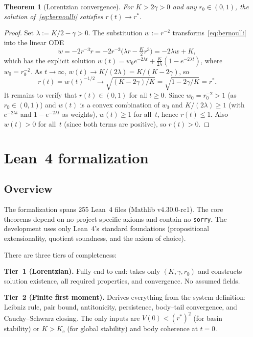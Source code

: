 \documentclass[11pt,a4paper]{article}
\newtheorem{theorem}{Theorem}[section]
\theoremstyle{definition}
\begin{document}
\begin{theorem}[Lorentzian convergence]\label{thm:lorentzian}
For $K>2\gamma>0$ and any $r_0\in(0,1)$, the solution of~\eqref{eq:bernoulli} satisfies $r(t)\to r^*$.
\end{theorem}

\begin{proof}
Set $\lambda:=K/2-\gamma>0$. The substitution $w:=r^{-2}$ transforms~\eqref{eq:bernoulli} into the linear ODE
\[
\dot w = -2r^{-3}\dot r = -2r^{-3}\bigl(\lambda r-\tfrac{K}{2}r^3\bigr) = -2\lambda w + K,
\]
which has the explicit solution $w(t) = w_0 e^{-2\lambda t} + \frac{K}{2\lambda}(1-e^{-2\lambda t})$, where $w_0=r_0^{-2}$. As $t\to\infty$, $w(t)\to K/(2\lambda)=K/(K-2\gamma)$, so
\[
r(t)=w(t)^{-1/2}\to\sqrt{(K-2\gamma)/K}=\sqrt{1-2\gamma/K}=r^*.
\]
It remains to verify that $r(t)\in(0,1)$ for all $t\geq 0$. Since $w_0=r_0^{-2}>1$ (as $r_0\in(0,1)$) and $w(t)$ is a convex combination of $w_0$ and $K/(2\lambda)\geq 1$ (with $e^{-2\lambda t}$ and $1-e^{-2\lambda t}$ as weights), $w(t)\geq 1$ for all~$t$, hence $r(t)\leq 1$. Also $w(t)>0$ for all~$t$ (since both terms are positive), so $r(t)>0$.
\end{proof}

\section{Lean~4 formalization}\label{sec:lean}

\subsection{Overview}

The formalization spans 255 Lean~4 files (Mathlib v4.30.0-rc1). The core theorems depend on no project-specific axioms and contain no \texttt{sorry}. The development uses only Lean~4's standard foundations (propositional extensionality, quotient soundness, and the axiom of choice).

There are three tiers of completeness:

\medskip\noindent\textbf{Tier~1 (Lorentzian).} Fully end-to-end: takes only $(K,\gamma,r_0)$ and constructs solution existence, all required properties, and convergence. No assumed fields.

\medskip\noindent\textbf{Tier~2 (Finite first moment).} Derives everything from the system definition: Leibniz rule, pair bound, antitonicity, persistence, body--tail convergence, and Cauchy--Schwarz closing. The only inputs are $V(0)<(r^*)^2$ (for basin stability) or $K>K_c$ (for global stability) and body coherence at $t=0$.
\end{document}

